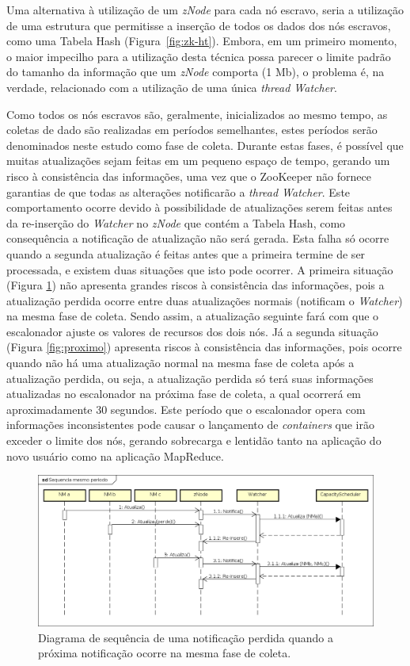 Uma alternativa à utilização de um \textit{zNode} para cada nó escravo, seria a utilização de uma estrutura que permitisse a inserção de todos os dados dos nós escravos, como uma Tabela Hash (Figura~\ref{fig:zk-ht}). Embora, em um primeiro momento, o maior impecilho para a utilização desta técnica possa parecer o limite padrão do tamanho da informação que um \textit{zNode} comporta (1 Mb), o problema é, na verdade, relacionado com a utilização de uma única \textit{thread Watcher}. 

Como todos os nós escravos são, geralmente, inicializados ao mesmo tempo, as coletas de dado são realizadas em períodos semelhantes, estes períodos serão denominados neste estudo como fase de coleta. Durante estas fases, é possível que muitas atualizações sejam feitas em um pequeno espaço de tempo, gerando um risco à consistência das informações, uma vez que o ZooKeeper não fornece garantias de que todas as alterações notificarão a \textit{thread Watcher}. Este comportamento ocorre devido à possibilidade de atualizações serem feitas antes da re-inserção do \textit{Watcher} no \textit{zNode} que contém a Tabela Hash, como consequência a notificação de atualização não será gerada. Esta falha só ocorre quando a segunda atualização é feitas antes que a primeira termine de ser processada, e existem duas situações que isto pode ocorrer. A primeira situação (Figura \ref{fig:mesmo}) não apresenta grandes riscos à consistência das informações, pois a atualização perdida  ocorre entre duas atualizações normais (notificam o \textit{Watcher}) na mesma fase de coleta. Sendo assim, a atualização seguinte fará com que o escalonador ajuste os valores de recursos dos dois nós. Já a segunda situação (Figura \ref{fig:proximo}) apresenta riscos à consistência das informações, pois ocorre quando não há uma atualização normal na mesma fase de coleta após a atualização perdida, ou seja, a atualização perdida só terá suas informações atualizadas no escalonador na próxima fase de coleta, a qual ocorrerá em aproximadamente 30 segundos. Este período que o escalonador opera com informações inconsistentes pode causar o lançamento de \textit{containers} que irão exceder o limite dos nós, gerando sobrecarga e lentidão tanto na aplicação do novo usuário como na aplicação MapReduce.


\begin{figure}[!hbtn]
   \centering
   \includegraphics[width=\textwidth]{figuras/seq-sam-per.png}
   \caption{Diagrama de sequência de uma notificação perdida quando a próxima notificação ocorre na mesma fase de coleta.}
   \label{fig:mesmo}
\end{figure}


